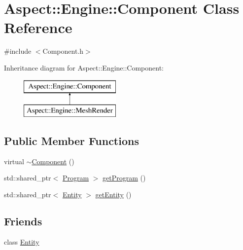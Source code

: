 \hypertarget{class_aspect_1_1_engine_1_1_component}{}\section{Aspect\+:\+:Engine\+:\+:Component Class Reference}
\label{class_aspect_1_1_engine_1_1_component}


{\ttfamily \#include $<$Component.\+h$>$}

Inheritance diagram for Aspect\+:\+:Engine\+:\+:Component\+:\begin{figure}[H]
\begin{center}
\leavevmode
\includegraphics[height=2.000000cm]{class_aspect_1_1_engine_1_1_component}
\end{center}
\end{figure}
\subsection*{Public Member Functions}
\begin{DoxyCompactItemize}
\item 
virtual \mbox{\hyperlink{class_aspect_1_1_engine_1_1_component_a8ceb47c002468c4ad876b7220da579f8}{$\sim$\+Component}} ()
\item 
std\+::shared\+\_\+ptr$<$ \mbox{\hyperlink{class_aspect_1_1_engine_1_1_program}{Program}} $>$ \mbox{\hyperlink{class_aspect_1_1_engine_1_1_component_a96e352a6d49b6e108572c0c19088aa52}{get\+Program}} ()
\item 
std\+::shared\+\_\+ptr$<$ \mbox{\hyperlink{class_aspect_1_1_engine_1_1_entity}{Entity}} $>$ \mbox{\hyperlink{class_aspect_1_1_engine_1_1_component_a1422571aabd1882f712e16ef4bf0cb77}{get\+Entity}} ()
\end{DoxyCompactItemize}
\subsection*{Friends}
\begin{DoxyCompactItemize}
\item 
class \mbox{\hyperlink{class_aspect_1_1_engine_1_1_component_a614439ccac0344926adc4c0165d64060}{Entity}}
\end{DoxyCompactItemize}


